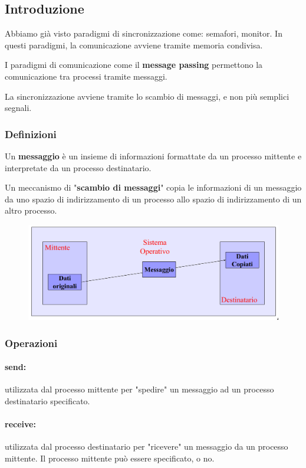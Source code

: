 \subsection{Introduzione}
Abbiamo già visto paradigmi di sincronizzazione come: semafori, monitor. In questi paradigmi, la comunicazione avviene tramite memoria condivisa.

I paradigmi di comunicazione come il \textbf{message passing} permettono la comunicazione tra processi tramite messaggi.

La sincronizzazione avviene tramite lo scambio di messaggi, e non più semplici segnali.

\subsubsection{Definizioni}
Un \textbf{messaggio} è un insieme di informazioni formattate da un processo mittente e interpretate da un processo destinatario.

Un meccanismo di "\textbf{scambio di messaggi}" copia le informazioni di un messaggio da uno spazio di indirizzamento
di un processo allo spazio di indirizzamento di un altro processo.
\begin{figure} [h]
    \centering
    \includegraphics[width=0.7\linewidth]{Images/Screenshot 2025-01-16 at 13-01-13 so-03.1-concorrenza - so-03.1-concorrenza.pdf.png}
\end{figure}

\subsubsection{Operazioni}
\paragraph{send:} utilizzata dal processo mittente per "spedire" un messaggio ad un processo destinatario specificato.
\paragraph{receive:} utilizzata dal processo destinatario per "ricevere" un messaggio da un processo mittente. Il processo mittente può essere specificato, o no.

